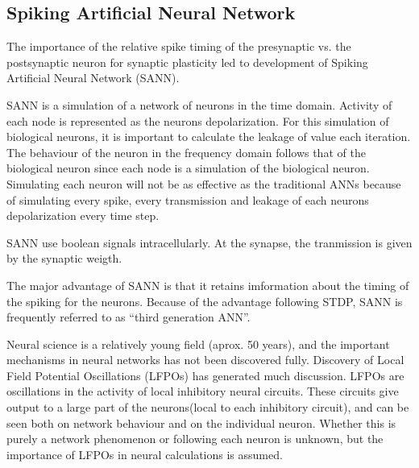 
\subsection{Spiking Artificial Neural Network}
The importance of the relative spike timing of the presynaptic vs. the postsynaptic neuron for synaptic plasticity led to development of Spiking Artificial Neural Network (SANN). 

SANN is a simulation of a network of neurons in the time domain. Activity of each node is represented as the neurons depolarization. For this simulation of biological neurons, it is important to calculate the leakage of value each iteration. 
The behaviour of the neuron in the frequency domain follows that of the biological neuron since each node is a simulation of the biological neuron. %
Simulating each neuron will not be as effective as the traditional ANNs because of simulating every spike, every transmission and leakage of each neurons depolarization every time step. 

SANN use boolean signals intracellularly. At the synapse, the tranmission is given by the synaptic weigth. 

The major advantage of SANN is that it retains imformation about the timing of the spiking for the neurons. 
Because of the advantage following STDP, SANN is frequently referred to as ``third generation ANN''. 

Neural science is a relatively young field (aprox. 50 years), and the important mechanisms in neural networks has not been discovered fully. 
Discovery of Local Field Potential Oscillations (LFPOs) has generated much discussion. LFPOs are oscillations in the activity of local inhibitory neural circuits. 
These circuits give output to a large part of the neurons(local to each inhibitory circuit), and can be seen both on network behaviour and on the individual neuron. 
Whether this is purely a network phenomenon or following each neuron is unknown, but the importance of LFPOs in neural calculations is assumed.

